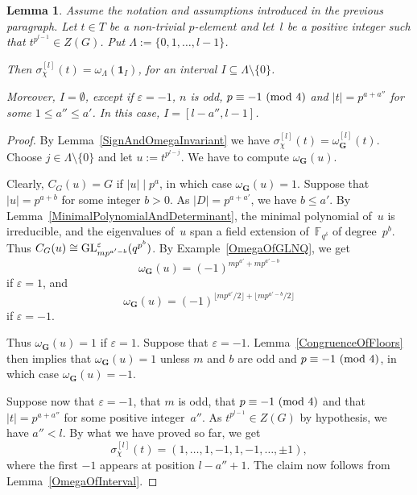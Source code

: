\documentclass[12pt]{amsart}
\newcommand{\bG}{{\mathbf{G}}}      %
\def\GL{ \text{\rm GL} }
\newtheorem{lem}[thm]{Lemma}
\theoremstyle{theorem}
\theoremstyle{definition}
\theoremstyle{remark}
\begin{document}
\begin{lem}
\label{SignSequenceLem}
Assume the notation and assumptions introduced in the previous paragraph.
Let $t \in {T}$ be a non-trivial $p$-element and let~$l$ be a positive 
integer such that $t^{p^{l-1}} \in Z( {G} )$. Put 
$\Lambda := \{ 0, 1, \ldots, l - 1 \}$. 

Then $\sigma_{{\chi}}^{[l]}( t ) = \omega_{\Lambda}( \mathbf{1}_I )$, for 
an interval $I \subseteq \Lambda \setminus\{0\}$. 

Moreover, $I = \emptyset$, except if $\varepsilon = -1$, $n$ is odd, 
$p \equiv -1\,\,(\mbox{\rm mod}\,\,4)$ and $|t| = p^{a+a''}$ for some 
$1 \leq a'' \leq a'$. In this case, $I = [l - a'', l - 1]$.
\end{lem}
\begin{proof}
By Lemma~\ref{SignAndOmegaInvariant} we have $\sigma_{{\chi}}^{[l]}( t ) = 
\omega_{{\bG}}^{[l]}( t )$. Choose $j \in \Lambda \setminus \{0\}$ and
let $u := t^{p^{l - j}}$. We have to compute $\omega_{{\bG}}( u )$.

Clearly, $C_{{G}}( u ) = {G}$ if $|u| \mid p^a$, in which case 
$\omega_{{\bG}}( u ) = 1$. Suppose that $|u| = p^{a+b}$ for some integer 
$b > 0$.  As $|{D}| = p^{a+a'}$, we have $b \leq a'$. By 
Lemma~\ref{MinimalPolynomialAndDeterminant}, the minimal polynomial of~$u$ is
irreducible, and the eigenvalues of~$u$ span a field extension
of~$\mathbb{F}_{q^{\delta}}$ of degree~$p^b$.
Thus $C_{{G}}( u ) \cong \GL^{\varepsilon}_{mp^{a'-b}}( q^{p^b} )$. 
By Example~\ref{OmegaOfGLNQ}, we get 
$$\omega_{{\bG}}( u ) = (-1)^{mp^{a'} + mp^{a'-b}}$$
if $\varepsilon = 1$,
and 
$$\omega_{{\bG}}( u ) = (-1)^{\lfloor mp^{a'}/2 \rfloor + \lfloor mp^{a'-b}/2 \rfloor}$$
if $\varepsilon = -1$.

Thus $\omega_{{\bG}}( u ) = 1$ if $\varepsilon = 1$. Suppose that
$\varepsilon = - 1$. Lemma~\ref{CongruenceOfFloors} then implies that 
$\omega_{{\bG}}( u ) = 1$ unless $m$ and $b$ are odd 
and $p \equiv -1\,\,(\mbox{\rm mod}\,\,4)$, in which case 
$\omega_{{\bG}}( u ) = -1$.

Suppose now that $\varepsilon = -1$, that $m$ is odd, that
$p \equiv -1\,\,(\mbox{\rm mod}\,\,4)$ and that $|t| = p^{a + a''}$ for some
positive integer~$a''$. As $t^{p^{l-1}} \in Z({G})$ by hypothesis, we have 
$a'' < l$. By what we have proved so far, we get 
$$\sigma_{{\chi}}^{[l]}( t ) = (1, \ldots, 1, -1, 1, -1, \ldots, \pm 1),$$
where the first $-1$ appears at position $l - a'' + 1$.
The claim now follows from Lemma~\ref{OmegaOfInterval}.
\end{proof}
\end{document}
